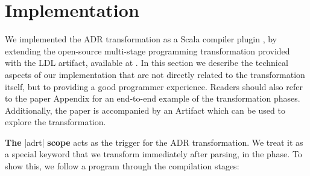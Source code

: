 \section{Implementation}
\label{sec:impl}


We implemented the ADR transformation as a Scala compiler plugin \cite{ildl-plugin}, by extending the open-source multi-stage programming transformation provided with the LDL \cite{ldl} artifact, available at \cite{ldl-staging-plugin}. In this section we describe the technical aspects of our implementation that are not directly related to the transformation itself, but to providing a good programmer experience. Readers should also refer to the paper Appendix for an end-to-end example of the transformation phases. Additionally, the paper is accompanied by an Artifact which can be used to explore the transformation.



\vspace{0.3em}
\noindent \textbf{The} |adrt| \textbf{scope} acts as the trigger for the ADR transformation.
%
We treat it as a special keyword that we transform immediately after parsing, in the \postparser{} phase.
To show this, we follow a program through the compilation stages:

